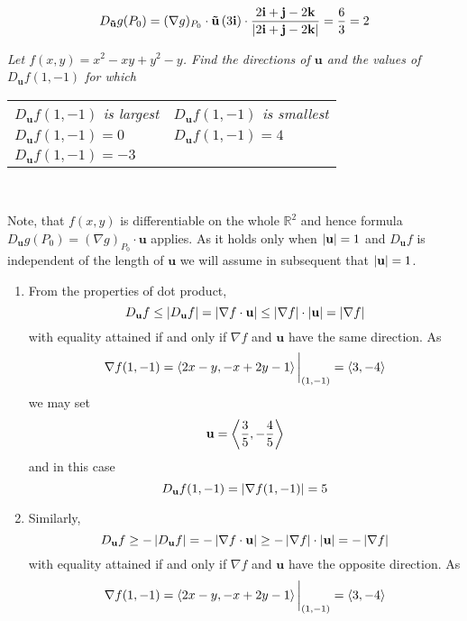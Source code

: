\documentclass[8pt]{article} %
\begin{document}
\begin{description}
{		\[D_\mathbf{\tilde{u}}g(P_0)=(\nabla g)_{P_0}\cdot\mathbf{\tilde{u}}
		\left(3\mathbf{i}\right)\cdot\frac{{2\mathbf{i}+\mathbf{j}-2\mathbf{k}}}{\left|2\mathbf{i}+\mathbf{j}-2\mathbf{k}\right|}
		=\frac{6}{3}=2\]
		}
	\item[\# 29.]{{\it Let $f(x,y)=x^2-xy+y^2-y$. Find the directions of $\mathbf{u}$ and the values of $D_{\mathbf{u}}f(1,-1)$
		for which}
		\begin{inparaenum}[\bfseries a.]
			\setlength{\tabcolsep}{15pt}
			\begin{tabular}{ll}
		\item {\it $D_{\mathbf{u}}f(1,-1)$ is largest}
		&\item {\it $D_{\mathbf{u}}f(1,-1)$ is smallest}\\
		\item {\it $D_{\mathbf{u}}f(1,-1)=0$}
		&\item {\it $D_{\mathbf{u}}f(1,-1)=4$}\\
		\item {\it $D_{\mathbf{u}}f(1,-1)=-3$}\\
		\end{tabular}
		\end{inparaenum}\\
		}
		Note, that $f(x,y)$ is differentiable on the whole $\mathbb{R}^2$ and hence formula
		$D_{\mathbf{u}}g(P_0)=(\nabla g)_{P_0}\cdot\mathbf{u}$ applies. As it holds only
		when $\left|\mathbf{u}\right|=1$ and 
		$D_{\mathbf{u}}f$ is independent of the length of $\mathbf{u}$ we will assume in subsequent that $\left|\mathbf{u}\right|
		=1$.
		\begin{enumerate}[\bfseries a.]
			\item From the properties of dot product,
				\[D_{\mathbf{u}}f\leq\left|D_{\mathbf{u}}f\right|=\left|\nabla f\cdot\mathbf{u}\right|\leq
				\left|\nabla f\right|\cdot\left|\mathbf{u}\right|=\left|\nabla f\right|\]
				with equality attained if and only if $\nabla f$ and $\mathbf{u}$ have the same direction. As
				\[\nabla f(1,-1)=\left<2x-y,-x+2y-1\right>\bigg|_{(1,-1)}=\left<3,-4\right>\]
				we may set \[\mathbf{u}=\left<\frac{3}{5},-\frac{4}{5}\right>\]
				and in this case
				\[D_{\mathbf{u}}f(1,-1)=\left|\nabla f(1,-1)\right|=5\]
			\item Similarly,
				\[D_{\mathbf{u}}f\geq-\left|D_{\mathbf{u}}f\right|=-\left|\nabla f\cdot\mathbf{u}\right|\geq-\left|\nabla f\right|
				\cdot\left|\mathbf{u}\right|=-\left|\nabla{f}\right|\]
				with equality attained if and only if $\nabla f$ and $\mathbf{u}$ have the opposite direction. As
				\[\nabla f(1,-1)=\left<2x-y,-x+2y-1\right>\bigg|_{(1,-1)}=\left<3,-4\right>\]

\end{enumerate}
\end{description}
\end{document}
